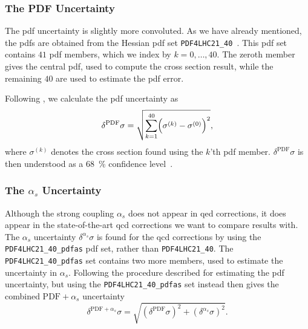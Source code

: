 \subsubsection{The PDF Uncertainty}
The \gls{pdf} uncertainty is slightly more convoluted.
As we have already mentioned, the \glspl{pdf} are obtained from the Hessian \gls{pdf} set \texttt{PDF4LHC21\_40}~\cite{PDF4LHCWorkingGroup:2022cjn}.
This \gls{pdf} set contains $41$ \gls{pdf} members, which we index by $k=0,\ldots,40$.
The zeroth member gives the central \gls{pdf}, used to compute the cross section result, while the remaining $40$ are used to estimate the \gls{pdf} error.

Following \cite{PDF4LHCWorkingGroup:2022cjn}, we calculate the \gls{pdf} uncertainty as
\begin{equation}
    \delta^{\mathrm{PDF}}\sigma = \sqrt{\sum_{k=1}^{40} \Bigl(\sigma^{(k)} - \sigma^{(0)} \Bigr)^2},
\end{equation}
where $\sigma^{(k)}$ denotes the cross section found using the $k$'th \gls{pdf} member. $\delta^{\mathrm{PDF}}\sigma$ is then understood as a \qty{68}{\percent} confidence level~\cite{PDF4LHCWorkingGroup:2022cjn}.

\subsubsection{The \texorpdfstring{$\alpha_s$}{αs} Uncertainty}
Although the strong coupling $\alpha_s$ does not appear in \gls{qed} corrections, it does appear in the state-of-the-art \gls{qcd} corrections we want to compare results with.
The $\alpha_s$ uncertainty $\delta^{\alpha_s}\sigma$ is found for the \gls{qcd} corrections by using the \texttt{PDF4LHC21\_40\_pdfas} \gls{pdf} set, rather than \texttt{PDF4LHC21\_40}.
The \texttt{PDF4LHC21\_40\_pdfas} set contains two more members, used to estimate the uncertainty in $\alpha_s$.
Following the procedure described for estimating the \gls{pdf} uncertainty, but using the \texttt{PDF4LHC21\_40\_pdfas} set instead then gives the combined $\mathrm{PDF}+\alpha_s$ uncertainty
\begin{equation}
    \delta^{\mathrm{PDF}+\alpha_s}\sigma = \sqrt{(\delta^{\mathrm{PDF}}\sigma)^2 + (\delta^{\alpha_s}\sigma)^2}.
\end{equation}

